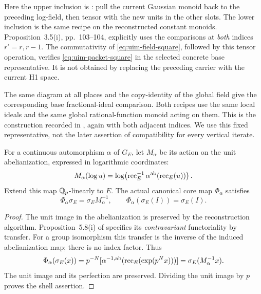Here the upper inclusion is
\cite[Proposition~3.4(ii), pp.~102--103]{IUT3}:
pull the current Gaussian monoid back to the
preceding log-field, then tensor with the
new units in the other slots.
The lower inclusion is the same recipe on
the reconstructed constant monoids.
Proposition~3.5(i), pp.~103--104, explicitly
uses the comparisons at \emph{both}
indices \(r'=r,r-1\).
The commutativity of
\eqref{eq:uim-field-square}, followed by
this tensor operation, verifies
\eqref{eq:uim-packet-square} in the selected
concrete base representative.
It is not obtained by replacing the
preceding carrier with the current H1 space.

The same diagram at all places and the
copy-identity of the global field give
the corresponding base fractional-ideal
comparison. Both recipes use the same
local ideals and the same global
rational-function monoid acting on them.
This is the construction recorded in
\cite[Proposition~3.10(i), pp.~147--148]{IUT3},
again with both adjacent indices.
We use this fixed representative, not the
later assertion of compatibility for every
vertical iterate.

\begin{proposition}
\label{prop:uim-transfer}
For a continuous automorphism \(\alpha\) of \(G_E\),
let \(M_\alpha\) be its action on the unit
abelianization, expressed in logarithmic coordinates:
\begin{equation}\label{eq:uim-canonical-matrix}
 M_\alpha(\log u)
   =\log\!\left(\operatorname{rec}_E^{-1}
       \alpha^{\rm ab}(\operatorname{rec}_E(u))\right).
\end{equation}
Extend this map \(\mathbb Q_p\)-linearly to \(E\).
The actual canonical core map \(\Phi_\alpha\)
satisfies
\begin{equation}\label{eq:uim-transfer}
       \Phi_\alpha\sigma_E=\sigma_E M_\alpha^{-1},
       \qquad
       \Phi_\alpha(\sigma_E(I))=\sigma_E(I).
\end{equation}
\end{proposition}
\begin{proof}
The unit image in the abelianization is preserved
by the reconstruction algorithm.
Proposition~5.8(i) of
\cite[p.~139]{MochizukiAbsTopIII2015}
specifies its \emph{contravariant} functoriality
by transfer. For a group isomorphism this
transfer is the inverse of the induced
abelianization map; there is no index factor.
Thus
\[
 \Phi_\alpha(\sigma_E(x))
  =p^{-N}[\alpha^{-1,{\rm ab}}
       (\operatorname{rec}_E(\exp(p^Nx)))]
  =\sigma_E(M_\alpha^{-1}x).
\]
The unit image and its perfection are preserved.
Dividing the unit image by \(p\) proves the
shell assertion.
\end{proof}

